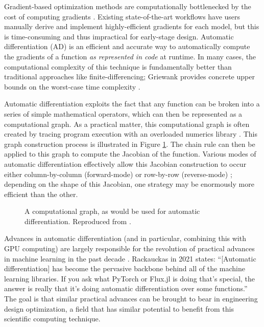 \documentclass[12pt,vi,oneside,table]{report}
\begin{document}
    Gradient-based optimization methods are computationally bottlenecked by the cost of computing gradients \cite{lyu_benchmarking_2014, martins_engineering_2021}. Existing state-of-the-art workflows have users manually derive and implement highly-efficient gradients for each model, but this is time-consuming and thus impractical for early-stage design. Automatic differentiation (AD) is an efficient and accurate way to automatically compute the gradients of a function \textit{as represented in code} at runtime. In many cases, the computational complexity of this technique is fundamentally better than traditional approaches like finite-differencing; Griewank provides concrete upper bounds on the worst-case time complexity \cite{griewank_automatic_1988}.

    Automatic differentiation exploits the fact that any function can be broken into a series of simple mathematical operators, which can then be represented as a computational graph. As a practical matter, this computational graph is often created by tracing program execution with an overloaded numerics library \cite{maclaurin_autograd_2015}. This graph construction process is illustrated in Figure \ref{fig:computational-graph}. The chain rule can then be applied to this graph to compute the Jacobian of the function. Various modes of automatic differentiation effectively allow this Jacobian construction to occur either column-by-column (forward-mode) or row-by-row (reverse-mode) \cite{casadi, jax, martins_engineering_2021}; depending on the shape of this Jacobian, one strategy may be enormously more efficient than the other.

    \begin{figure}[H]
        \centering
        \centerline{}
        \caption{A computational graph, as would be used for automatic differentiation. Reproduced from \cite{sharpe_aerosandbox_2021}.}
        \label{fig:computational-graph}
    \end{figure}

    Advances in automatic differentiation (and in particular, combining this with GPU computing) are largely responsible for the revolution of practical advances in machine learning in the past decade \cite{baydin_automatic_2018}. Rackauckas in 2021 \cite{rackauckas_generalizing_2021} states: ``[Automatic differentiation] has become the pervasive backbone behind all of the machine learning libraries. If you ask what PyTorch or Flux.jl is doing that’s special, the answer is really that it’s doing automatic differentiation over some functions.'' The goal is that similar practical advances can be brought to bear in engineering design optimization, a field that has similar potential to benefit from this scientific computing technique.
\end{document}
